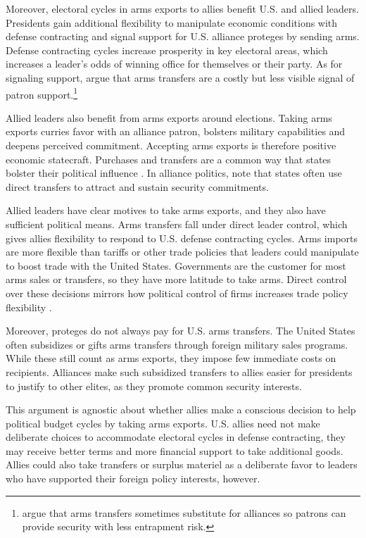\documentclass[12pt]{article}
\begin{document}
Moreover, electoral cycles in arms exports to allies benefit U.S. and allied leaders.
Presidents gain additional flexibility to manipulate economic conditions with defense contracting and signal support for U.S. alliance proteges by sending arms.
Defense contracting cycles increase prosperity in key electoral areas, which increases a leader's odds of winning office for themselves or their party. 
As for signaling support, \citet{McManusYarhi-Milo2017} argue that arms transfers are a costly but less visible signal of patron support.\footnote{\citet{Yarhi-Miloetal2016} argue that arms transfers sometimes substitute for alliances so patrons can provide security with less entrapment risk.}


Allied leaders also benefit from arms exports around elections.
Taking arms exports curries favor with an alliance patron, bolsters military capabilities and deepens perceived commitment.
Accepting arms exports is therefore positive economic statecraft. 
Purchases and transfers are a common way that states bolster their political influence \citep[pg. 42-3]{Baldwin2020}.
In alliance politics, \citet[pg. 184-5]{IkenberryGrieco2003} note that states often use direct transfers to attract and sustain security commitments.  


Allied leaders have clear motives to take arms exports, and they also have sufficient political means. 
Arms transfers fall under direct leader control, which gives allies flexibility to respond to U.S. defense contracting cycles.
Arms imports are more flexible than tariffs or other trade policies that leaders could manipulate to boost trade with the United States.
Governments are the customer for most arms sales or transfers, so they have more latitude to take arms.
Direct control over these decisions mirrors how political control of firms increases trade policy flexibility \citep{Davisetal2019}.


Moreover, proteges do not always pay for U.S. arms transfers.
The United States often subsidizes or gifts arms transfers through foreign military sales programs. 
While these still count as arms exports, they impose few immediate costs on recipients.
Alliances make such subsidized transfers to allies easier for presidents to justify to other elites, as they promote common security interests. 


This argument is agnostic about whether allies make a conscious decision to help political budget cycles by taking arms exports.
U.S. allies need not make deliberate choices to accommodate electoral cycles in defense contracting, they may receive better terms and more financial support to take additional goods. 
Allies could also take transfers or surplus materiel as a deliberate favor to leaders who have supported their foreign policy interests, however. 
\end{document}
